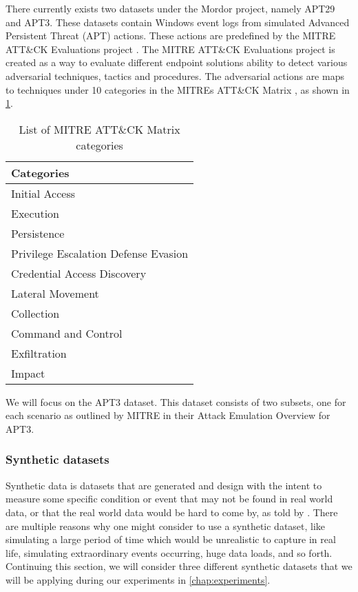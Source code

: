 There currently exists two datasets under the Mordor project, namely APT29 and APT3. These datasets contain Windows event logs from simulated Advanced Persistent Threat (APT) actions. These actions are predefined by the MITRE ATT\&CK Evaluations project \cite{MITREevals}. The MITRE ATT\&CK Evaluations project is created as a way to evaluate different endpoint solutions ability to detect various adversarial techniques, tactics and procedures. The adversarial actions are maps to techniques under 10 categories in the MITREs ATT\&CK Matrix \cite{MITREmatrix}, as shown in \cref{tab:mitre-attack-categories}.

\begin{table}[htbp]
\centering
\begin{tabular}{|l|}
\hline
Categories \\ \hline
Initial Access \\
Execution \\
Persistence \\
Privilege Escalation
Defense Evasion \\
Credential Access
Discovery \\
Lateral Movement \\
Collection \\
Command and Control \\
Exfiltration \\
Impact \\ \hline
\end{tabular}
\caption{List of MITRE ATT\&CK Matrix categories}
\label{tab:mitre-attack-categories}
\end{table}

We will focus on the APT3 dataset. This dataset consists of two subsets, one for each scenario as outlined by MITRE in their Attack Emulation Overview \cite{MITREattackevalapt3} for APT3.

\subsubsection{Synthetic datasets}
Synthetic data is datasets that are generated and design with the intent to measure some specific condition or event that may not be found in real world data, or that the real world data would be hard to come by, as told by \textcite{barse2003synthesizing}. There are multiple reasons why one might consider to use a synthetic dataset, like simulating a large period of time which would be unrealistic to capture in real life, simulating extraordinary events occurring, huge data loads, and so forth. Continuing this section, we will consider three different synthetic datasets that we will be applying during our experiments in \cref{chap:experiments}.

